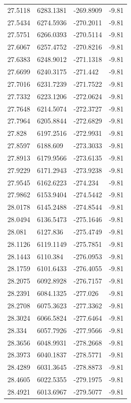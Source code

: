 \begin{table}[H]
\begin{tabular}{llll}
27.5118 & 6283.1381 & -269.8909 & -9.81 \\
27.5434 & 6274.5936 & -270.2011 & -9.81 \\
27.5751 & 6266.0393 & -270.5114 & -9.81 \\
27.6067 & 6257.4752 & -270.8216 & -9.81 \\
27.6383 & 6248.9012 & -271.1318 & -9.81 \\
27.6699 & 6240.3175 & -271.442 & -9.81 \\
27.7016 & 6231.7239 & -271.7522 & -9.81 \\
27.7332 & 6223.1206 & -272.0624 & -9.81 \\
27.7648 & 6214.5074 & -272.3727 & -9.81 \\
27.7964 & 6205.8844 & -272.6829 & -9.81 \\
27.828 & 6197.2516 & -272.9931 & -9.81 \\
27.8597 & 6188.609 & -273.3033 & -9.81 \\
27.8913 & 6179.9566 & -273.6135 & -9.81 \\
27.9229 & 6171.2943 & -273.9238 & -9.81 \\
27.9545 & 6162.6223 & -274.234 & -9.81 \\
27.9862 & 6153.9404 & -274.5442 & -9.81 \\
28.0178 & 6145.2488 & -274.8544 & -9.81 \\
28.0494 & 6136.5473 & -275.1646 & -9.81 \\
28.081 & 6127.836 & -275.4749 & -9.81 \\
28.1126 & 6119.1149 & -275.7851 & -9.81 \\
28.1443 & 6110.384 & -276.0953 & -9.81 \\
28.1759 & 6101.6433 & -276.4055 & -9.81 \\
28.2075 & 6092.8928 & -276.7157 & -9.81 \\
28.2391 & 6084.1325 & -277.026 & -9.81 \\
28.2708 & 6075.3623 & -277.3362 & -9.81 \\
28.3024 & 6066.5824 & -277.6464 & -9.81 \\
28.334 & 6057.7926 & -277.9566 & -9.81 \\
28.3656 & 6048.9931 & -278.2668 & -9.81 \\
28.3973 & 6040.1837 & -278.5771 & -9.81 \\
28.4289 & 6031.3645 & -278.8873 & -9.81 \\
28.4605 & 6022.5355 & -279.1975 & -9.81 \\
28.4921 & 6013.6967 & -279.5077 & -9.81 \\

\end{tabular}
\end{table}
